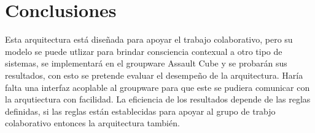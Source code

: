 \section{Conclusiones}
Esta arquitectura está diseñada para apoyar el trabajo colaborativo, pero su modelo se puede utlizar para brindar consciencia contexual a otro tipo de sistemas, se implementar\'a en el groupware Assault Cube y se probar\'an sus resultados, con esto se pretende evaluar el desempe\~no de la arquitectura. Har\'ia falta una interfaz acoplable al groupware para que este se pudiera comunicar con la arqutiectura con facilidad. La eficiencia de los resultados depende de las reglas definidas, si las reglas est\'an establecidas para apoyar al grupo de trabjo colaborativo entonces la arquitectura tambi\'en.
 